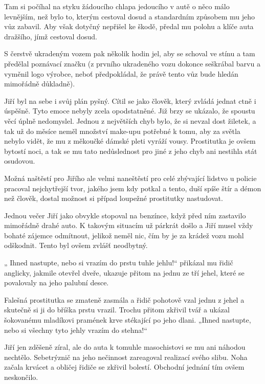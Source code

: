 Tam si počíhal na styku žádoucího chlapa jedoucího v autě o něco málo levnějším, než bylo to, kterým cestoval dosud a standardním způsobem mu jeho vůz zabavil. Aby však dotyčný nepřišel ke škodě, předal mu polohu a klíče auta dražšího, jímž cestoval dosud.

 S čerstvě ukradeným vozem pak několik hodin jel, aby se schoval ve stínu a tam předělal poznávací značku (z prvního ukradeného vozu dokonce seškrábal barvu a vyměnil logo výrobce, neboť předpokládal, že právě tento vůz bude hledán mimořádně důkladně).

Jiří byl na sebe i svůj plán pyšný. Cítil se jako člověk, který zvládá jednat ctně i úspěšně. Tyto emoce nebyly zcela opodstatněné. Již brzy se ukázalo, že spoustu věcí úplně nedomyslel. Jednou z největších chyb bylo, že si nevzal dost žiletek, a tak už do měsíce neměl množství make-upu potřebné k tomu, aby za světla nebylo vidět, že mu z měkoučké dámské pleti vyráží vousy. Prostitutka je ovšem bytostí noci, a tak se mu tato nedůslednost pro jiné z jeho chyb ani nestihla stát osudovou.

Možná naštěstí pro Jiřího ale velmi naneštěstí pro celé zbývající lidstvo u policie pracoval nejchytřejší tvor, jakého jsem kdy potkal a tento, duší spíše štír a démon než člověk, dostal možnost si případ loupežné prostitutky nastudovat.
\vspace{0.75cm}

Jednou večer Jiří jako obvykle stopoval na benzínce, když před ním zastavilo mimořádně drahé auto. K takovým situacím už párkrát došlo a Jiří musel vždy bohaté zájemce odmítnout, jelikož neměl nic, čím by je za krádež vozu mohl odškodnit. Tento byl ovšem zvlášť neodbytný.

„ Ihned nastupte, nebo si vrazím do prstu tuhle jehlu!“ přikázal mu řidič anglicky, jakmile otevřel dveře, ukazuje přitom na jednu ze tří jehel, které se povalovaly na jeho palubní desce.

Falešná prostitutka se zmateně zasmála a řidič pohotově vzal jednu z jehel a skutečně si ji do bříška prstu vrazil. Trochu přitom zkřivil tvář a ukázal šokovanému mladíkovi pramének krve stékající po jeho dlani. „Ihned nastupte, nebo si všechny tyto jehly vrazím do stehna!“

Jiří jen zděšeně zíral, ale do auta k tomuhle masochistovi se mu ani náhodou nechtělo. Sebetrýznič na jeho nečinnost zareagoval realizací svého slibu. Noha začala krvácet a obličej řidiče se zkřivil bolestí. Obchodní jednání tím ovšem neskončilo.

